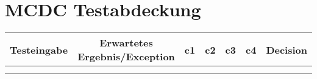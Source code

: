 \chapter{MCDC Testabdeckung}
\begin{center}
	\begin{tabular}{ c c c c c c c }
		\hline
		Testeingabe & Erwartetes Ergebnis/Exception & c1 & c2 & c3 & c4 & Decision  \\
		\hline 
		 &  & & & & &  \\  
		 &  & & & & &   
	\end{tabular}
\end{center}